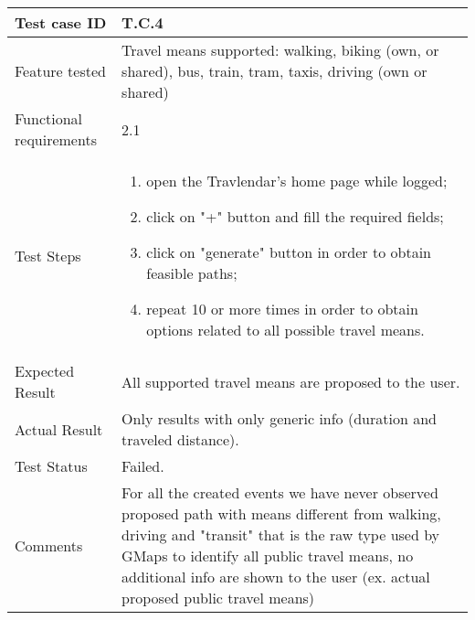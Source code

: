\begin{table}[H]
	\begin{center}
		\begin{tabular}{ | p{} | p{} | }
		\hline
		Test case ID & T.C.4\\
		\hline
		Feature tested & Travel means supported: walking, biking (own, or shared), bus, train, tram, taxis, driving (own or shared)  \\
		\hline
		Functional requirements & 2.1   \\
		\hline
		Test Steps & 
			\begin{enumerate}
				\item open the Travlendar's home page while logged;
				\item click on "+" button and fill the required fields;
				\item click on "generate" button in order to obtain feasible paths;
				\item repeat 10 or more times in order to obtain options related to all possible travel means.
			\end{enumerate} \\
		\hline
		Expected Result & All supported travel means are proposed to the user.\\
		\hline
		Actual Result & Only results with only generic info (duration and traveled distance).  \\ 
		\hline
		Test Status & \color{Red}Failed.\\ 
		\hline
		Comments & For all the created events we have never observed proposed path with means different from walking, driving and "transit" that is the raw type used by GMaps to identify all public travel means, no additional info are shown to the user (ex. actual proposed public travel means) \\ 
		\hline
		\end{tabular}
	\end{center}
\end{table}

